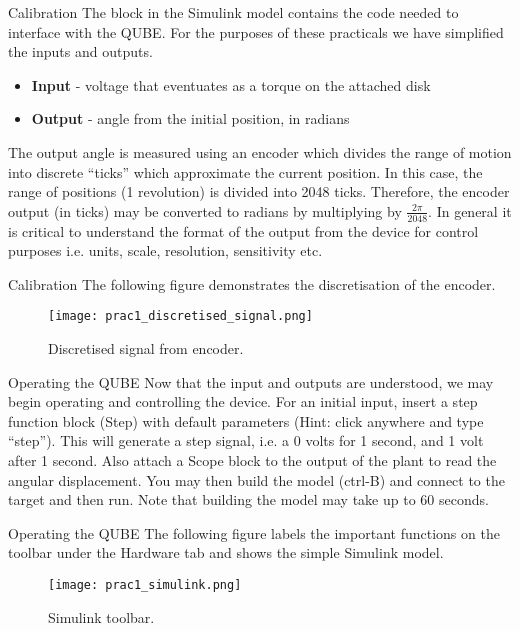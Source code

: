 \documentclass[9pt]{beamer-control}
\begin{document}
\begin{frame}{Calibration}
The block in the Simulink model contains the code needed to interface with the QUBE. For the purposes of these practicals we have simplified the inputs and outputs. 

\begin{itemize}
	\item \textbf{Input} - voltage that eventuates as a torque on the attached disk
	\item \textbf{Output} - angle from the initial position, in radians
\end{itemize}

The output angle is measured using an encoder which divides the range of motion into discrete ``ticks” which approximate the current position. In this case, the range of positions (1 revolution) is divided into 2048 ticks. Therefore, the encoder output (in ticks) may be converted to radians by multiplying by $\tfrac{2\pi}{2048}$. In general it is critical to understand the format of the output from the device for control purposes i.e. units, scale, resolution, sensitivity etc. 


\end{frame}

\begin{frame}{Calibration}
The following figure demonstrates the discretisation of the encoder.
\begin{figure}
\centering
\texttt{[image: prac1\_discretised\_signal.png]}
\caption{Discretised signal from encoder.}
\end{figure}

\end{frame}



\begin{frame}{Operating the QUBE}
	Now that the input and outputs are understood, we may begin operating and controlling the device. For an initial input, insert a step function block (Step) with default parameters (Hint: click anywhere and type “step”). This will generate a step signal, i.e. a 0 volts for 1 second, and 1 volt after 1 second. Also attach a Scope block to the output of the plant to read the angular displacement. You may then build the model (ctrl-B) and connect to the target and then run. Note that building the model may take up to 60 seconds. 
\end{frame}

\begin{frame}{Operating the QUBE}
	The following figure labels the important functions on the toolbar under the Hardware tab and shows the simple Simulink model.
\begin{figure}
	\centering
	\texttt{[image: prac1\_simulink.png]}
	\caption{Simulink toolbar.}
\end{figure}
\end{frame}
\end{document}
